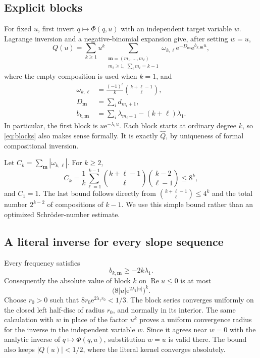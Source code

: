 \documentclass[11pt,a4paper]{article}
\numberwithin{equation}{section}
\theoremstyle{definition}
\theoremstyle{remark}
\theoremstyle{definition}
\newcommand{\Q}{\widehat Q}
\newcommand{\e}{\mathrm e}
\newcommand{\Ree}{\operatorname{Re}}
\begin{document}
\subsection{Explicit blocks}
For fixed $u$, first invert $q\mapsto\Phi(q,u)$ with an independent
target variable $w$. Lagrange inversion and a negative-binomial expansion
give, after setting $w=u$,
\begin{equation}
 Q(u)=\sum_{k\ge1}u^k
       \sum_{\substack{\mathbf m=(m_1,\ldots,m_\ell)\\
                        m_i\ge1,\ \sum_i m_i=k-1}}
                 \omega_{k,\ell}\e^{-D_{\mathbf m}}
                                    \e^{b_{k,\mathbf m}u},
 \label{eq:blocks}
\end{equation}
where the empty composition is used when $k=1$, and
\begin{align}
 \omega_{k,\ell}&=\frac{(-1)^\ell}{k}\binom{k+\ell-1}{\ell},\label{eq:weight}\\
 D_{\mathbf m}&=\sum_i d_{m_i+1},\label{eq:cost}\\
 b_{k,\mathbf m}&=\sum_i\lambda_{m_i+1}-(k+\ell)\lambda_1.
 \label{eq:frequency}
\end{align}
In particular, the first block is $u\e^{-\lambda_1u}$. Each block starts
at ordinary degree $k$, so \eqref{eq:blocks} also makes sense formally.
It is exactly $\Q$, by uniqueness of formal compositional inversion.

Let $C_k=\sum_{\mathbf m}|\omega_{k,\ell}|$. For $k\ge2$,
\begin{equation}
 C_k=\frac1k\sum_{\ell=1}^{k-1}
           \binom{k+\ell-1}{\ell}\binom{k-2}{\ell-1}
       \le8^k,
 \label{eq:mass}
\end{equation}
and $C_1=1$. The last bound follows directly from
$\binom{k+\ell-1}{\ell}\le4^k$ and the total number $2^{k-2}$ of
compositions of $k-1$. We use this simple bound rather than an optimized
Schr\"oder-number estimate.

\subsection{A literal inverse for every slope sequence}
Every frequency satisfies
\begin{equation}
 b_{k,\mathbf m}\ge-2k\lambda_1.
 \label{eq:negative-frequency}
\end{equation}
Consequently the absolute value of block $k$ on $\Ree u\le0$ is at most
\[
 \bigl(8|u|\e^{2\lambda_1|u|}\bigr)^k.
\]
Choose $r_0>0$ such that
$8r_0\e^{2\lambda_1r_0}<1/3$. The block series converges uniformly on the
closed left half-disc of radius $r_0$, and normally in its interior.
The same calculation with $w$ in place of the factor $u^k$ proves a
uniform convergence radius for the inverse in the independent variable
$w$. Since it agrees near $w=0$ with the analytic inverse of
$q\mapsto\Phi(q,u)$, substitution $w=u$ is valid there. The bound also
keeps $|Q(u)|<1/2$, where the literal kernel converges absolutely.
\end{document}
